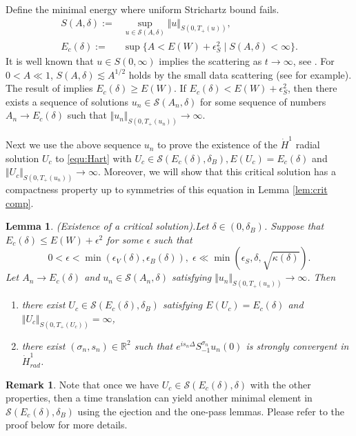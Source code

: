 \documentclass[reqno, 11pt]{amsart}
\numberwithin{equation}{section}
\newcommand{\R}{\mathbb{R}}
\theoremstyle{plain}
\newtheorem{lemma}[theorem]{Lemma}
\theoremstyle{definition}
\newtheorem{remark}[theorem]{Remark}
\numberwithin{equation}{section}
\numberwithin{theorem}{section}
\numberwithin{equation}{section}
\numberwithin{equation}{section}
\numberwithin{theorem}{section}
\begin{document}
	Define the minimal energy where uniform Strichartz bound fails.
	\begin{equation*}
	\begin{aligned}
	S(A,\delta):=&\sup_{u\in \mathscr{S}(A,\delta)} \Vert u \Vert_{S(0,T_{+}(u))},\\
	E_c(\delta):=&\sup\{A<E(W)+ \epsilon_{S}^2\;|\;S(A,\delta)<\infty \}.
	\end{aligned}
	\end{equation*}
	It is well known that $u\in S(0,\infty)$ implies the scattering as $t\to \infty$, see \cite{Caz:book}. For $0<A\ll 1$, $S(A,\delta)\lesssim A^{1/2}$ holds by the small data scattering (see \cite{Caz:book} for example). The result of \cite{MXZ:crit Hart:f rad} implies $E_c(\delta)\geq E(W)$. If $E_c(\delta)<E(W)+\epsilon_{S}^2$, then there exists a sequence of solutions $u_n \in \mathscr{S}(A_n,\delta)$ for some sequence of numbers $A_n \to E_c(\delta)$ such that $\Vert u_n \Vert_{S(0,T_{+}(u_n))} \to \infty$.
	
	Next we use the above sequence $u_n$ to prove the existence of the $\dot H^1$ radial solution $U_c$ to \eqref{equ:Hart} with $U_c \in \mathscr{S}(E_c(\delta),\delta_{B}), E(U_c)=E_c(\delta)$ and $\Vert U_c \Vert_{S(0,T_{+}(u_n))} \to \infty$. Moreover, we will show that this critical solution has a compactness property up to symmetries of this equation in Lemma \ref{lem:crit comp}.
	\begin{lemma}(Existence of a critical solution).\label{lem:crit exis} Let $\delta\in(0,\delta_{B})$. Suppose that $E_c(\delta)\leq E(W)+\epsilon^2$ for some $\epsilon$ such that
		\begin{equation*}	
		0<\epsilon<\min(\epsilon_{V}(\delta),\epsilon_{B}(\delta)),\;\epsilon\ll \min (\epsilon_{S},\delta,\sqrt{\kappa(\delta)}).
		\end{equation*}	
		Let $A_n \to E_c(\delta)$ and $u_n \in \mathscr{S}(A_n,\delta)$ satisfying $\Vert u_n \Vert_{S(0,T_{+}(u_n))} \to \infty$. Then 
		\begin{enumerate}
			\item[$(1)$] there exist $U_c \in \mathscr{S}(E_c(\delta),\delta_{B})$ satisfying $E(U_c)=E_c(\delta)$ and $\Vert U_c \Vert_{S(0,T_{+}(U_c))}=\infty $,
			\item[$(2)$] there exist $(\sigma_{n},s_n)\in \R^2$ such that $e^{is_n \Delta}S_{-1}^{\sigma_{n}}u_n(0)$ is strongly convergent in $\dot H^1_{rad}$.
		\end{enumerate}
	\end{lemma}
	\begin{remark}
		Note that once we have $U_c \in \mathscr{S}(E_c(\delta),\delta)$ with the other properties, then a time translation can yield another minimal element in $\mathscr{S}(E_c(\delta),\delta_{B})$ using the ejection and the one-pass lemmas. Please refer to the proof below for more details. 
	\end{remark}
	
\end{document}
